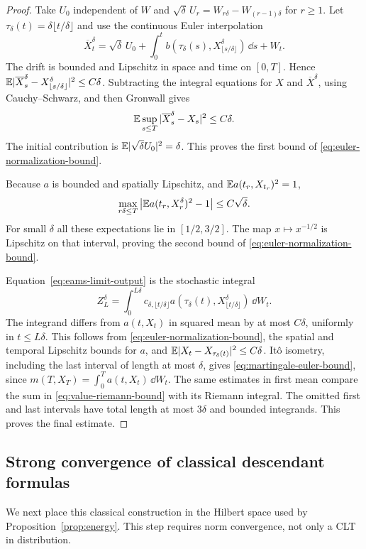 \begin{proof}
Take $U_0$ independent of $W$ and
$\sqrt\delta\,U_r=W_{r\delta}-W_{(r-1)\delta}$ for $r\ge1$.
Let $\tau_\delta(t)=\delta\lfloor t/\delta\rfloor$ and use the
continuous Euler interpolation
\[
 \overline X^\delta_t
 =\sqrt\delta\,U_0+
       \int_0^tb(\tau_\delta(s),X^\delta_{\lfloor s/\delta\rfloor})\,\dd s
       +W_t.
\]
The drift is bounded and Lipschitz in space and time on $[0,T]$.
Hence
$\mathbb E|\overline X^\delta_s-X^\delta_{\lfloor s/\delta\rfloor}|^2
\le C\delta$.
Subtracting the integral equations for $X$ and
$\overline X^\delta$, using Cauchy--Schwarz, and then Gronwall gives
\[
 \mathbb E\sup_{s\le T}|\overline X^\delta_s-X_s|^2\le C\delta.
\]
The initial contribution is $\mathbb E|\sqrt\delta U_0|^2=\delta$.
This proves the first bound of \eqref{eq:euler-normalization-bound}.

Because $a$ is bounded and spatially Lipschitz, and
$\mathbb E a(t_r,X_{t_r})^2=1$,
\[
 \max_{r\delta\le T}
 \left|\mathbb E a(t_r,X^\delta_r)^2-1\right|\le C\sqrt\delta.
\]
For small $\delta$ all these expectations lie in $[1/2,3/2]$.
The map $x\mapsto x^{-1/2}$ is Lipschitz on that interval, proving
the second bound of \eqref{eq:euler-normalization-bound}.

Equation~\eqref{eq:eams-limit-output} is the stochastic integral
\[
 Z^\delta_L=\int_0^{L\delta}
 c_{\delta,\lfloor t/\delta\rfloor}
 a(\tau_\delta(t),X^\delta_{\lfloor t/\delta\rfloor})\,\dd W_t.
\]
The integrand differs from $a(t,X_t)$ in squared mean by at most
$C\delta$, uniformly in $t\le L\delta$.  This follows from
\eqref{eq:euler-normalization-bound}, the spatial and temporal
Lipschitz bounds for $a$, and
$\mathbb E|X_t-X_{\tau_\delta(t)}|^2\le C\delta$.
It\^o isometry, including the last interval of length at most
$\delta$, gives \eqref{eq:martingale-euler-bound}, since
$m(T,X_T)=\int_0^Ta(t,X_t)\,\dd W_t$.
The same estimates in first mean compare the sum in
\eqref{eq:value-riemann-bound} with its Riemann integral.
The omitted first and last intervals have total length at most
$3\delta$ and bounded integrands.  This proves the final estimate.
\end{proof}

\subsection{Strong convergence of classical descendant formulas}

We next place this classical construction in the Hilbert space used
by Proposition~\ref{prop:energy}.  This step requires norm convergence,
not only a CLT in distribution.

